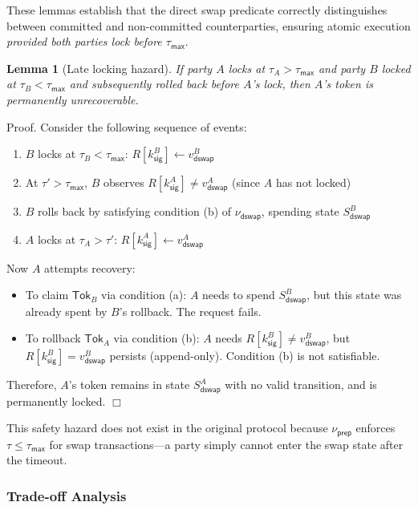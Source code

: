 \documentclass{article}
\newtheorem{lemma}{Lemma}[section]
\newenvironment{proof}{\textsf{Proof}.}{\hfill$\Box$}
\begin{document}
\noindent These lemmas establish that the direct swap predicate correctly distinguishes between committed and non-committed counterparties, ensuring atomic execution \emph{provided both parties lock before $\tau_\mathsf{max}$}.

\begin{lemma}[Late locking hazard]\label{le:dswap-late}
If party $A$ locks at $\tau_A > \tau_\mathsf{max}$ and party $B$ locked at $\tau_B < \tau_\mathsf{max}$ and subsequently rolled back before $A$'s lock, then $A$'s token is permanently unrecoverable.
\end{lemma}
\begin{proof}
Consider the following sequence of events:
\begin{enumerate}
\item $B$ locks at $\tau_B < \tau_\mathsf{max}$: $R[k^B_\mathsf{sig}] \gets v^B_\mathsf{dswap}$
\item At $\tau' > \tau_\mathsf{max}$, $B$ observes $R[k^A_\mathsf{sig}] \neq v^A_\mathsf{dswap}$ (since $A$ has not locked)
\item $B$ rolls back by satisfying condition (b) of $\nu_\mathsf{dswap}$, spending state $S^B_\mathsf{dswap}$
\item $A$ locks at $\tau_A > \tau'$: $R[k^A_\mathsf{sig}] \gets v^A_\mathsf{dswap}$
\end{enumerate}
Now $A$ attempts recovery:
\begin{itemize}
\item To claim $\mathsf{Tok}_B$ via condition (a): $A$ needs to spend $S^B_\mathsf{dswap}$, but this state was already spent by $B$'s rollback. The request fails.
\item To rollback $\mathsf{Tok}_A$ via condition (b): $A$ needs $R[k^B_\mathsf{sig}] \neq v^B_\mathsf{dswap}$, but $R[k^B_\mathsf{sig}] = v^B_\mathsf{dswap}$ persists (append-only). Condition (b) is not satisfiable.
\end{itemize}
Therefore, $A$'s token remains in state $S^A_\mathsf{dswap}$ with no valid transition, and is permanently locked.
\end{proof}

\noindent This safety hazard does not exist in the original protocol because $\nu_\mathsf{prep}$ enforces $\tau \le \tau_\mathsf{max}$ for swap transactions---a party simply cannot enter the swap state after the timeout.

\subsubsection{Trade-off Analysis}
\end{document}
